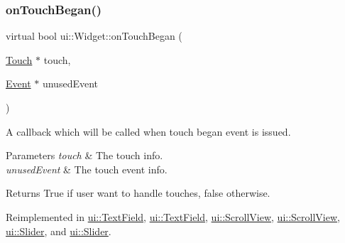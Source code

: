 \mbox{\label{classui_1_1Widget_a130372b032ebba2c5328f66c11a3d268}} 
\subsubsection{\texorpdfstring{on\+Touch\+Began()}{onTouchBegan()}\hspace{0.1cm}{\footnotesize\ttfamily [2/2]}}
{\footnotesize\ttfamily virtual bool ui\+::\+Widget\+::on\+Touch\+Began (\begin{DoxyParamCaption}\item[{\hyperlink{classTouch}{Touch} $\ast$}]{touch,  }\item[{\hyperlink{classEvent}{Event} $\ast$}]{unused\+Event }\end{DoxyParamCaption})\hspace{0.3cm}{\ttfamily [virtual]}}

A callback which will be called when touch began event is issued. 
\begin{DoxyParams}{Parameters}
{\em touch} & The touch info. \\
\hline
{\em unused\+Event} & The touch event info. \\
\hline
\end{DoxyParams}
\begin{DoxyReturn}{Returns}
True if user want to handle touches, false otherwise. 
\end{DoxyReturn}


Reimplemented in \hyperlink{classui_1_1TextField_ad747be5e9c98b2aa44d839dfd282fc2e}{ui\+::\+Text\+Field}, \hyperlink{classui_1_1TextField_a4716933981fd6f75e03baed7ec565587}{ui\+::\+Text\+Field}, \hyperlink{classui_1_1ScrollView_a04c7e9105bf26f9d79cd907c6b23f41d}{ui\+::\+Scroll\+View}, \hyperlink{classui_1_1ScrollView_a8cef5058b831f9b3644d894408371245}{ui\+::\+Scroll\+View}, \hyperlink{classui_1_1Slider_a87345df854374dff2d59a401349e8de8}{ui\+::\+Slider}, and \hyperlink{classui_1_1Slider_af3407f0844a379de234e2d321f3fb562}{ui\+::\+Slider}.

\mbox{\label{classui_1_1Widget_a8622ea26dcf72e2197d1a1b0d6ce9cbd}} 
